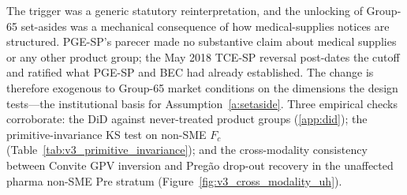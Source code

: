 The trigger was a generic statutory reinterpretation, and the unlocking of Group-65 set-asides was a mechanical consequence of how medical-supplies notices are structured. PGE-SP's parecer made no substantive claim about medical supplies or any other product group; the May 2018 TCE-SP reversal post-dates the cutoff and ratified what PGE-SP and BEC had already established. The change is therefore exogenous to Group-65 market conditions on the dimensions the design tests---the institutional basis for Assumption~\ref{a:setaside}. Three empirical checks corroborate: the DiD against \controlGroupCount{} never-treated product groups (\ref{app:did}); the primitive-invariance KS test on non-SME $F_c$ (Table~\ref{tab:v3_primitive_invariance}); and the cross-modality consistency between Convite GPV inversion and Preg\~ao drop-out recovery in the unaffected pharma non-SME Pre stratum (Figure~\ref{fig:v3_cross_modality_uh}).

